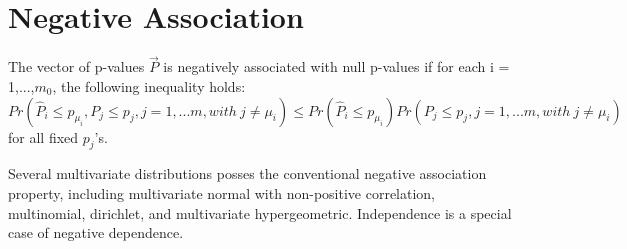 \documentclass{article}
\begin{document}
\section{Negative Association}
The vector of p-values $\overrightarrow{P}$ is negatively associated with null p-values if for each i = 1,...,$m_0$, the following inequality holds:
$$  Pr\left( \hat{P}_i \leq p_{\mu_i} , P_j \leq p_j , j = 1,...m, with \ j \neq \mu_i \right) \leq Pr \left(\hat{P}_i \leq p_{\mu_i} \right) Pr \left( P_j \leq p_j , j = 1,...m, with \ j \neq \mu_i\right)$$
for all fixed $p_j$'s.

Several multivariate distributions posses the conventional negative association property, including multivariate normal with non-positive correlation, multinomial, dirichlet, and multivariate hypergeometric. Independence is a special case of negative dependence.
\end{document}
